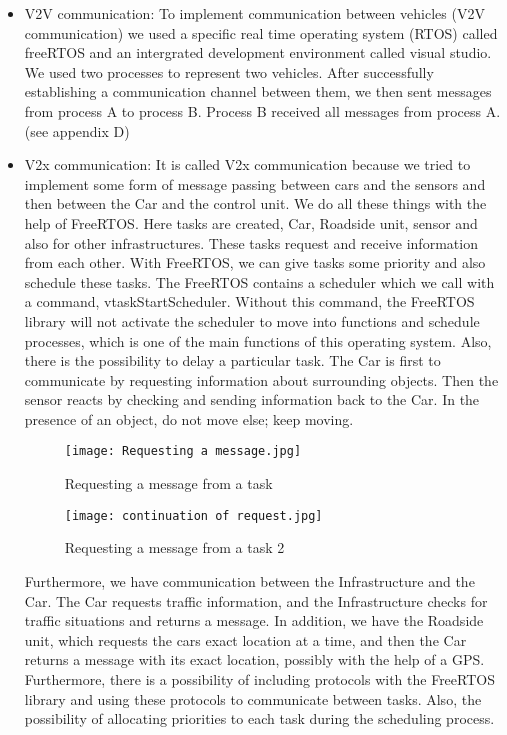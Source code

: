 \documentclass[conference]{IEEEtran}
\begin{document}
\begin{itemize}
\item V2V communication: \newline
To implement communication between vehicles (V2V communication) we used a specific real time operating system (RTOS) called freeRTOS and an intergrated development environment called visual studio.   
We used two processes to represent two vehicles. After successfully establishing a communication channel between them, we then sent  messages from process A to process B. Process B received all messages from process A. (see appendix D) 

\item V2x communication: \newline
It is called V2x communication because we tried to implement some form of message passing between cars and the sensors and then between the Car and the control unit. We do all these things with the help of FreeRTOS. Here tasks are created, Car, Roadside unit, sensor and also for other infrastructures. These tasks request and receive information from each other. With FreeRTOS, we can give tasks some priority and also schedule these tasks. The FreeRTOS contains a scheduler which we call with a command, vtaskStartScheduler. Without this command, the FreeRTOS library will not activate the scheduler to move into functions and schedule processes, which is one of the main functions of this operating system. Also, there is the possibility to delay a particular task. The Car is first to communicate by requesting information about surrounding objects. Then the sensor reacts by checking and sending information back to the Car. In the presence of an object, do not move else; keep moving.

\begin{figure}[htp]
    \centering
    \texttt{[image: Requesting a message.jpg]}
    \caption{Requesting  a  message from a task}
    \label{fig:reg-gen}
\end{figure}

\begin{figure}[htp]
    \centering
    \texttt{[image: continuation of request.jpg]}
    \caption{Requesting  a  message from a task 2}
    \label{fig:reg-gen}
\end{figure}



Furthermore, we have communication between the Infrastructure and the Car. The Car requests traffic information, and the Infrastructure checks for traffic situations and returns a message. In addition, we have the Roadside unit, which requests the cars exact location at a time, and then the Car returns a message with its exact location, possibly with the help of a GPS. Furthermore, there is a possibility of including protocols with the FreeRTOS library and using these protocols to communicate between tasks. Also, the possibility of allocating priorities to each task during the scheduling process.


\end{itemize}
\end{document}
